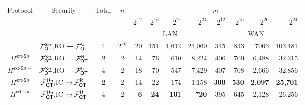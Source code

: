 \begin{figure*}[t!]\centering
	\begin{tabular}{|c||c|c|c || r | r|  r |r |r|r |r|r|}
		\hline
		\multirow{3}{*}{Protocol} &         \multirow{3}{*}{Security}          & \multirow{3}{*}{Total} & \multirow{3}{*}{$n$} &                                     \multicolumn{8}{c|}{$m$}                                     \\
		                          &                                            &                         &                      & $2^{12}$ & $2^{16}$ & $2^{20}$ & $2^{24}$  & $2^{12}$  &  $2^{16}$ & $2^{20}$    &      $2^{24}$ \\ \cline{5-12}
		                          &                                            &          Rounds         &                      &          \multicolumn{4}{c|}{LAN}          &              \multicolumn{4}{c|}{WAN}               \\ \hline\hline
		                          &  $\mathcal{F}_{\mathsf{OT}}^{\mathsf{S} u},$RO $\rightarrow\mathcal{F}_{\mathsf{OT}}^\mathsf{U}$  &            4            &       $2^{76}$       & 20       & 151      & 1,612    & 24,060    & 345       &       833 & 7003        &       103,481 \\ \hline
		 $\Pi^{\textsf{ext-S}u}$  & $\mathcal{F}_{\mathsf{OT}}^{\mathsf{S} u},$RO $\rightarrow\mathcal{F}_{\mathsf{OT}}^\mathsf{R}$ &         {\bf 2}         &          2           & 14       & 76       & 610      & 8,224     & 406       &       700 & 6,488       &        32,315 \\ \hline
		$\Pi^{\textsf{ext-S}u+}$  &  $\mathcal{F}_{\mathsf{OT}}^{\mathsf{S} u},$RO $\rightarrow\mathcal{F}_{\mathsf{OT}}^\mathsf{U}$  &            4            &          2           & 18       & 70       & 547      & 7,429     & 407       &       708 & 2,666       &        32,856 \\ \hline
		 $\Pi^{\textsf{ext-S}u}$  &  $\mathcal{F}_{\mathsf{OT}}^{\mathsf{U} u},$IC $\rightarrow\mathcal{F}_{\mathsf{OT}}^\mathsf{R}$   &         {\bf 2}         &          2           & 14       & 22       & 174      & 1,158     & {\bf 300} & {\bf 530} & {\bf 2,097} & {\bf  25,701} \\ \hline
		 $\Pi^{\textsf{ext-U}u}$   &   $\mathcal{F}_{\mathsf{OT}}^{\mathsf{U} u},$IC $\rightarrow\mathcal{F}_{\mathsf{OT}}^\mathsf{U}$    &           4            &          2           & {\bf6}   & {\bf24}  & {\bf101} & {\bf 720} & {395}     &    { 645} & {2,128}     &      {26,256} \\ \hline
	\end{tabular}
	\caption{ \label{fig:extTimes}}	
\end{figure*}



